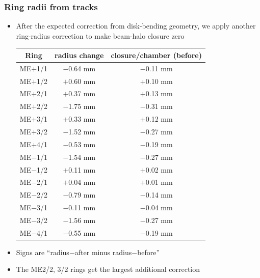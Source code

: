 \documentclass[compress]{beamer}
\begin{document}
\begin{frame}
\frametitle{Ring radii from tracks}

\begin{itemize}
\item After the expected correction from disk-bending geometry, we
  apply another ring-radius correction to make beam-halo closure zero

\begin{tabular}{c c c}
Ring & radius change & closure/chamber (before) \\\hline
ME$+$1/1 & $-$0.64 mm & $-$0.11 mm \\
ME$+$1/2 & $+$0.60 mm & $+$0.10 mm \\
ME$+$2/1 & $+$0.37 mm & $+$0.13 mm \\
ME$+$2/2 & $-$1.75 mm & $-$0.31 mm \\
ME$+$3/1 & $+$0.33 mm & $+$0.12 mm \\
ME$+$3/2 & $-$1.52 mm & $-$0.27 mm \\
ME$+$4/1 & $-$0.53 mm & $-$0.19 mm \\\hline
ME$-$1/1 & $-$1.54 mm & $-$0.27 mm \\
ME$-$1/2 & $+$0.11 mm & $+$0.02 mm \\
ME$-$2/1 & $+$0.04 mm & $+$0.01 mm \\
ME$-$2/2 & $-$0.79 mm & $-$0.14 mm \\
ME$-$3/1 & $-$0.11 mm & $-$0.04 mm \\
ME$-$3/2 & $-$1.56 mm & $-$0.27 mm \\
ME$-$4/1 & $-$0.55 mm & $-$0.19 mm \\
\end{tabular}

\item Signs are ``radius$-$after minus radius$-$before''

\item The ME2/2, 3/2 rings get the largest additional correction
\end{itemize}
\end{frame}
\end{document}

